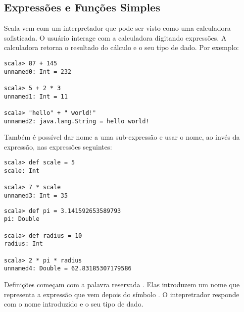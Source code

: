 \begin{itemize}
\section{Expressões e Funções Simples}

Scala vem com um interpretador que pode ser visto como uma calculadora sofisticada.
O usuário interage com a calculadora digitando expressões. A calculadora retorna o
resultado do cálculo e o seu tipo de dado. Por exemplo: 

\begin{lstlisting}
scala> 87 + 145
unnamed0: Int = 232

scala> 5 + 2 * 3
unnamed1: Int = 11

scala> "hello" + " world!"
unnamed2: java.lang.String = hello world!
\end{lstlisting}
Também é possível dar nome a uma sub-expressão e usar o nome, ao invés da expressão, 
nas expressões seguintes:
\begin{lstlisting}
scala> def scale = 5
scale: Int

scala> 7 * scale
unnamed3: Int = 35
\end{lstlisting}
\begin{lstlisting}
scala> def pi = 3.141592653589793
pi: Double

scala> def radius = 10
radius: Int

scala> 2 * pi * radius
unnamed4: Double = 62.83185307179586
\end{lstlisting}



Definições começam com a palavra reservada . Elas introduzem um nome
que representa a expressão que vem depois do símbolo \code{=}. O intepretrador
responde com o nome introduzido e o seu tipo de dado.


\end{itemize}
